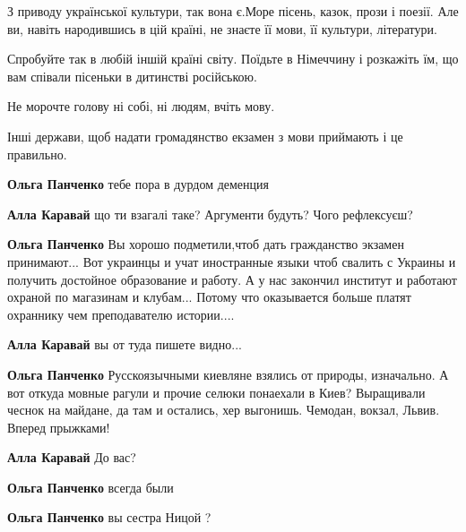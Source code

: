 \begin{itemize}
З приводу української культури, так вона є.Море пісень, казок, прози і поезії.
Але ви, навіть народившись в цій країні, не знаєте її мови, її культури,
літератури.

Спробуйте так в любій іншій країні світу. Поїдьте в Німеччину і розкажіть їм,
що вам співали пісеньки в дитинстві російською.

Не морочте голову ні собі, ні людям, вчіть мову.

Інші держави, щоб надати громадянство екзамен з мови приймають і це правильно.

\begin{itemize}

\textbf{Ольга Панченко} тебе пора в дурдом деменция

\textbf{Алла Каравай} що ти взагалі таке? Аргументи будуть? Чого рефлексуєш?

\textbf{Ольга Панченко} Вы хорошо подметили,чтоб дать гражданство экзамен
принимают... Вот украинцы и учат иностранные языки чтоб свалить с Украины и
получить достойное образование и работу. А у нас закончил институт и работают
охраной по магазинам и клубам... Потому что оказывается больше платят охраннику
чем преподавателю истории....

\textbf{Алла Каравай} вы от туда пишете видно...

\textbf{Ольга Панченко} Русскоязычными киевляне взялись от природы, изначально.
А вот откуда мовные рагули и прочие селюки понаехали в Киев? Выращивали чеснок
на майдане, да там и остались, хер выгонишь. Чемодан, вокзал, Львив. Вперед
прыжками!


\textbf{Алла Каравай} До вас?

\textbf{Ольга Панченко} всегда были

\textbf{Ольга Панченко} вы сестра Ницой ?



\end{itemize}
\end{itemize}
